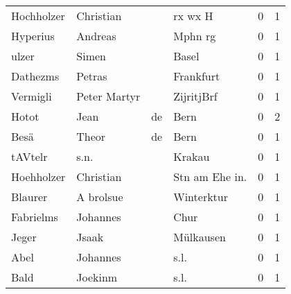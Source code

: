 \begin{center}
\begin{tiny}
\begin{longtabu}{llllrr}
               Hochholzer &                          Christian &             &                                     rx wx H &          0 &         1 \\
                 Hyperius &                            Andreas &             &                                     Mphn rg &          0 &         1 \\
                    ulzer &                              Simen &             &                                       Basel &          0 &         1 \\
                 Dathezms &                             Petras &             &                                   Frankfurt &          0 &         1 \\
                 Vermigli &                       Peter Martyr &             &                                  ZijritjBrf &          0 &         1 \\
                    Hotot &                               Jean &          de &                                        Bern &          0 &         2 \\
                     Besä &                              Theor &          de &                                        Bern &          0 &         1 \\
                  tAVtelr &                               s.n. &             &                                      Krakau &          0 &         1 \\
               Hoehholzer &                          Christian &             &                             Stn am Ehe in.  &          0 &         1 \\
                  Blaurer &                          A brolsue &             &                                  Winterktur &          0 &         1 \\
                Fabrielms &                           Johannes &             &                                        Chur &          0 &         1 \\
                    Jeger &                              Jsaak &             &                                   Mülkausen &          0 &         1 \\
                     Abel &                           Johannes &             &                                        s.l. &          0 &         1 \\
                     Bald &                            Joekinm &             &                                        s.l. &          0 &         1 \\

\end{longtabu}
\end{tiny}
\end{center}
